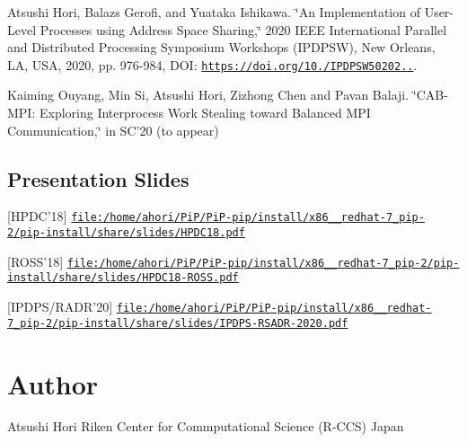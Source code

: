 Atsushi Hori, Balazs Gerofi, and Yuataka Ishikawa. \char`\"{}\-An Implementation
of User-\/\-Level Processes using Address Space Sharing,\char`\"{} 2020 I\-E\-E\-E International Parallel and Distributed Processing Symposium Workshops (I\-P\-D\-P\-S\-W), New Orleans, L\-A, U\-S\-A, 2020, pp. 976-\/984, D\-O\-I\-: \href{https://doi.org/10.1109/IPDPSW50202.2020.00161}{\tt https\-://doi.\-org/10./\-I\-P\-D\-P\-S\-W50202..}.

Kaiming Ouyang, Min Si, Atsushi Hori, Zizhong Chen and Pavan Balaji. \char`\"{}\-C\-A\-B-\/\-M\-P\-I\-: Exploring Interprocess Work Stealing toward Balanced
\-M\-P\-I Communication,\char`\"{} in S\-C’20 (to appear)

\subsection*{Presentation Slides}


\begin{DoxyItemize}
\item \mbox{[}H\-P\-D\-C'18\mbox{]} \href{file:/home/ahori/PiP/PiP-pip/install/x86_64_redhat-7_pip-2/pip-install/share/slides/HPDC18.pdf}{\tt file\-:/home/ahori/\-Pi\-P/\-Pi\-P-\/pip/install/x86\-\_\-\_\-redhat-\/7\-\_\-pip-\/2/pip-\/install/share/slides/\-H\-P\-D\-C18.\-pdf}
\item \mbox{[}R\-O\-S\-S'18\mbox{]} \href{file:/home/ahori/PiP/PiP-pip/install/x86_64_redhat-7_pip-2/pip-install/share/slides/HPDC18-ROSS.pdf}{\tt file\-:/home/ahori/\-Pi\-P/\-Pi\-P-\/pip/install/x86\-\_\-\_\-redhat-\/7\-\_\-pip-\/2/pip-\/install/share/slides/\-H\-P\-D\-C18-\/\-R\-O\-S\-S.\-pdf}
\item \mbox{[}I\-P\-D\-P\-S/\-R\-A\-D\-R'20\mbox{]} \href{file:/home/ahori/PiP/PiP-pip/install/x86_64_redhat-7_pip-2/pip-install/share/slides/IPDPS-RSADR-2020.pdf}{\tt file\-:/home/ahori/\-Pi\-P/\-Pi\-P-\/pip/install/x86\-\_\-\_\-redhat-\/7\-\_\-pip-\/2/pip-\/install/share/slides/\-I\-P\-D\-P\-S-\/\-R\-S\-A\-D\-R-\/2020.\-pdf} \section*{Author}
\end{DoxyItemize}

Atsushi Hori Riken Center for Commputational Science (R-\/\-C\-C\-S) Japan 
